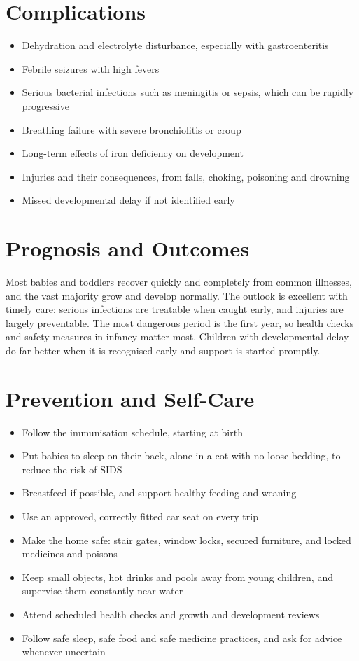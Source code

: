 \section*{Complications}
\begin{itemize}
    \item Dehydration and electrolyte disturbance, especially with gastroenteritis
    \item Febrile seizures with high fevers
    \item Serious bacterial infections such as meningitis or sepsis, which can be rapidly progressive
    \item Breathing failure with severe bronchiolitis or croup
    \item Long-term effects of iron deficiency on development
    \item Injuries and their consequences, from falls, choking, poisoning and drowning
    \item Missed developmental delay if not identified early
\end{itemize}

\section*{Prognosis and Outcomes}
Most babies and toddlers recover quickly and completely from common illnesses, and the vast majority grow and develop normally. The outlook is excellent with timely care: serious infections are treatable when caught early, and injuries are largely preventable. The most dangerous period is the first year, so health checks and safety measures in infancy matter most. Children with developmental delay do far better when it is recognised early and support is started promptly.

\section*{Prevention and Self-Care}
\begin{itemize}
    \item Follow the immunisation schedule, starting at birth
    \item Put babies to sleep on their back, alone in a cot with no loose bedding, to reduce the risk of SIDS
    \item Breastfeed if possible, and support healthy feeding and weaning
    \item Use an approved, correctly fitted car seat on every trip
    \item Make the home safe: stair gates, window locks, secured furniture, and locked medicines and poisons
    \item Keep small objects, hot drinks and pools away from young children, and supervise them constantly near water
    \item Attend scheduled health checks and growth and development reviews
    \item Follow safe sleep, safe food and safe medicine practices, and ask for advice whenever uncertain
\end{itemize}

